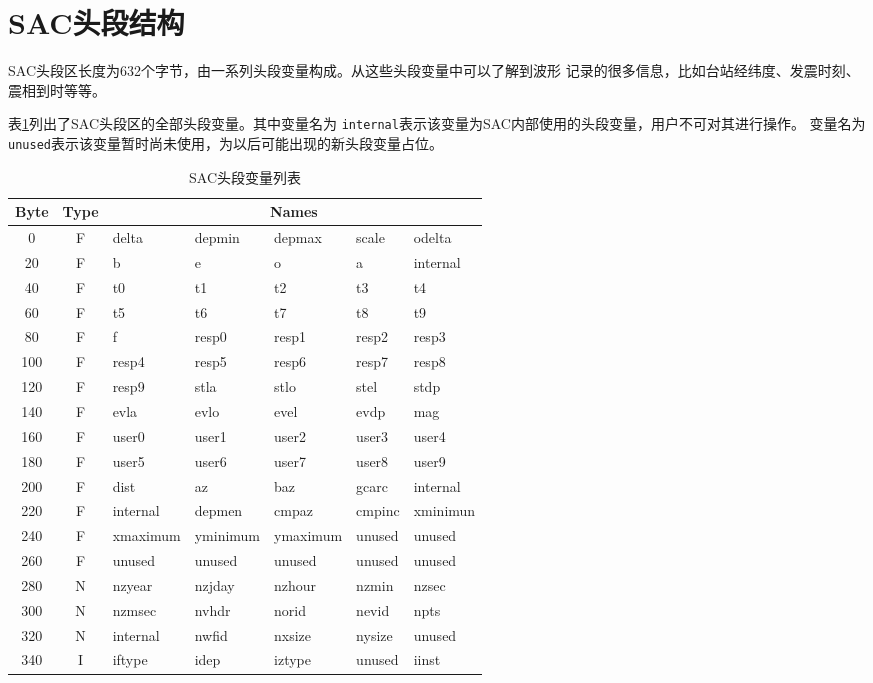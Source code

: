 \section{SAC头段结构}
SAC头段区长度为632个字节，由一系列头段变量构成。从这些头段变量中可以了解到波形
记录的很多信息，比如台站经纬度、发震时刻、震相到时等等。

表\ref{table:header-variables}列出了SAC头段区的全部头段变量。其中变量名为
\lstinline{internal}表示该变量为SAC内部使用的头段变量，用户不可对其进行操作。
变量名为\lstinline{unused}表示该变量暂时尚未使用，为以后可能出现的新头段变量占位。

\begin{table}[H]
\ttfamily
\small
\centering
\caption{SAC头段变量列表}
\label{table:header-variables}
\begin{tabular}{c|c|lllll}
	\toprule
    Byte	&	Type	&	\multicolumn{5}{c}{Names}\\
	\midrule
	0		&	F	&	delta	&	depmin	&	depmax	&	scale	&	odelta	\\
	20		&	F	&	b		&	e		&	o		&	a		&	internal\\
	40		&	F	&	t0		&	t1		&	t2		&	t3		&	t4		\\
	60		&	F	&	t5		&	t6		&	t7		&	t8		&	t9		\\
	80		&	F	&	f		&	resp0	&	resp1	&	resp2	&	resp3	\\
	100		&	F	&	resp4	&	resp5	&	resp6	&	resp7	&	resp8	\\
    120		&	F	&	resp9	&	stla	&	stlo	&	stel	&	stdp	\\
	140		&	F	&	evla	&	evlo	&	evel	&	evdp	&	mag		\\
	160		&	F	&	user0	&	user1	&	user2	&	user3	&	user4	\\
	180		&	F	&	user5	&	user6	&	user7	&	user8	&	user9	\\
	200		&	F	&	dist	&	az		&	baz		&	gcarc	&	internal\\
	220		&	F	&	internal&	depmen	&	cmpaz	&	cmpinc	&	xminimun\\
	240		&	F	&	xmaximum&	yminimum&	ymaximum&	unused	&	unused	\\
	260		&	F	&	unused	&	unused	&	unused	&	unused	&	unused	\\
	280		&	N	&	nzyear	&	nzjday	&	nzhour	&	nzmin	&	nzsec	\\
	300		&	N	&	nzmsec	&	nvhdr	&	norid	&	nevid	&	npts	\\
	320		&	N	&	internal&	nwfid	&	nxsize	&	nysize	&	unused	\\
	340		&	I	&	iftype	&	idep	&	iztype	&	unused	&	iinst	\\

\end{tabular}
\end{table}
